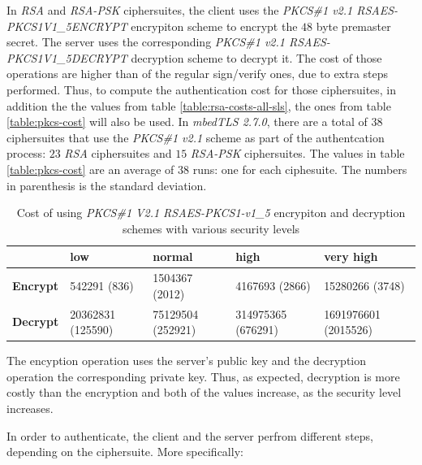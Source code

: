 \documentclass{llncs}
\begin{document}
In \textit{RSA} and \textit{RSA-PSK} ciphersuites, the client uses the \textit{PKCS\#1 v2.1 RSAES-PKCS1\-V1\_5\-ENCRYPT}\cite{RFC3447} 
encrypiton scheme to encrypt  the $48$ byte premaster secret. The server uses the corresponding \textit{PKCS\#1 v2.1 RSAES-PKCS1\-V1\_5\-DECRYPT}\cite{RFC3447}
decryption scheme to decrypt it. The cost of those operations are higher than of the regular sign/verify ones, due to extra steps performed.
Thus, to compute the authentication cost for those ciphersuites, in addition the the values from table \ref{table:rsa-costs-all-sls}, the ones
from table \ref{table:pkcs-cost} will also be used. In \textit{mbedTLS 2.7.0}, there are a total of
$38$ ciphersuites that use the \textit{PKCS\#1 v2.1} scheme as part of the authentcation process: $23$
\textit{RSA} ciphersuites and $15$ \textit{RSA-PSK} ciphersuites. The values in table \ref{table:pkcs-cost} are an average
of $38$ runs: one for each ciphesuite. The numbers in parenthesis is the standard deviation.

\begin{table}[]
  \begin{tabular}{|l|l|l|l|l|}
  \hline
                   & \textbf{low}      & \textbf{normal}   & \textbf{high}      & \textbf{very high}   \\ \hline
  \textbf{Encrypt} & 542291 (836)      & 1504367 (2012)    & 4167693 (2866)     & 15280266 (3748)      \\ \hline
  \textbf{Decrypt} & 20362831 (125590) & 75129504 (252921) & 314975365 (676291) & 1691976601 (2015526) \\ \hline
  \end{tabular}
  \caption{\label{table:pkcs-costt} Cost of using \textit{PKCS\#1 V2.1 RSAES-PKCS1-v1\_5} encrypiton and decryption schemes with various security levels}
  \end{table}

The encyption operation uses the server's public key and the decryption operation the corresponding private key. Thus, as expected,
decryption is more costly than the encryption and both of the values increase, as the security level increases.

In order to authenticate, the client and the server perfrom different steps, depending on the ciphersuite. More specifically:
\end{document}

